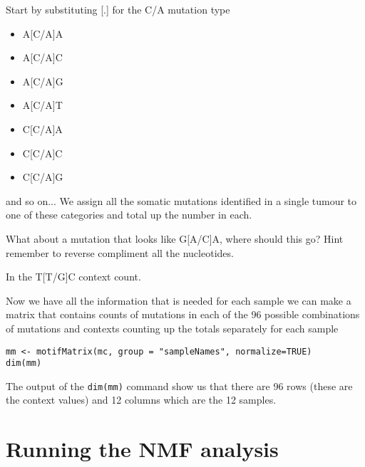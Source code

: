 \begin{information}
\vspace{4 mm}
Start by substituting [.] for the C/A mutation type
\begin{itemize}
\item A[C/A]A
\item A[C/A]C	    
\item A[C/A]G	    
\item A[C/A]T
\item C[C/A]A
\item C[C/A]C
\item C[C/A]G
\end{itemize}
and so on...
\vspace{4 mm}
We assign all the somatic mutations identified in a single tumour to one of these categories and total up the number in each.
\end{information}

\begin{questions}
What about a mutation that looks like G[A/C]A, where should this go?
Hint remember to reverse compliment all the nucleotides.
\end{questions}

\begin{answer}
    In the T[T/G]C context count.
\end{answer}

\begin{steps}
Now we have all the information that is needed for each sample we can make a matrix
that contains counts of mutations in each of the 96 possible combinations of
mutations and contexts counting up the totals separately for each sample

\begin{lstlisting}
mm <- motifMatrix(mc, group = "sampleNames", normalize=TRUE)
dim(mm)
\end{lstlisting}
\end{steps}

The output of the \texttt{dim(mm)} command show us that there are 96 rows (these are the context values)
and 12 columns which are the 12 samples.


\section{Running the NMF analysis}

